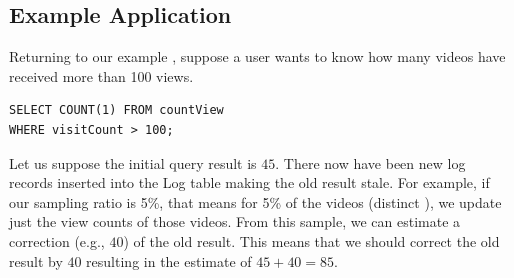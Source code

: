 \subsection{Example Application}
Returning to our example , suppose a user wants to know how many videos have received more than 100 views.
\begin{lstlisting}[basicstyle={\scriptsize}]
SELECT COUNT(1) FROM countView 
WHERE visitCount > 100;
\end{lstlisting}
Let us suppose the initial query result is $45$.
There now have been new log records inserted into the Log table making the old result stale.
For example, if our sampling ratio is 5\%, that means for 5\% of the videos (distinct ), we update just the view counts of those videos.
From this sample, we can estimate a correction (e.g., $40$) of the old result.
This means that we should correct the old result by $40$ resulting in the estimate of $45+40 = 85$.
